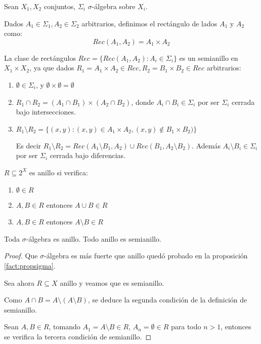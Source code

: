 \begin{example}
 \label{ex:rectangulos}
 \begin{definition*}
  Sean $X_1, X_2$ conjuntos, $\Sigma_i$ $\sigma$-álgebra sobre $X_i$. 
  
  Dados $A_1 \in \Sigma_1, A_2 \in \Sigma_2$ arbitrarios, definimos el rectángulo de lados $A_1$ y $A_2$ como:
  \[
    Rec(A_1, A_2) = A_1 \times A_2
  \]
 \end{definition*}
 
 
 La clase de rectángulos $Rec = \{Rec(A_1, A_2): A_i \in \Sigma_i\}$ es un semianillo en $X_1 \times X_2$,
 ya que dados $R_1 = A_1 \times A_2 \in Rec, R_2 = B_1 \times B_2 \in Rec$ arbitrarios:
 
 \begin{enumerate}
  \item $\emptyset \in \Sigma_i$, y $\emptyset \times \emptyset = \emptyset$
  \item $R_1 \cap R_2 = (A_1 \cap B_1) \times (A_2 \cap B_2)$, donde $A_i \cap B_i \in \Sigma_i$ por ser 
  $\Sigma_i$ cerrada bajo intersecciones.
  \item $R_1 \setminus R_2 = \{(x,y): (x,y) \in A_1 \times A_2, (x,y) \notin B_1 \times B_2)\}$
  
  Es decir $R_1 \setminus R_2 = Rec(A_1\setminus B_1, A_2) \cup Rec(B_1, A_2\setminus B_2)$. Además
  $A_i \setminus B_i \in \Sigma_i$ por ser $\Sigma_i$ cerrada bajo diferencias.
 \end{enumerate}

\end{example}


\begin{definition}[Anillo en $X$]
 $R\subseteq 2^X$ es anillo si verifica:
 
 \begin{enumerate}[i]
  \item $\emptyset \in R$
  \item $A,B \in R$ entonces $A\cup B \in R$
  \item $A,B \in R$ entonces $A\setminus B \in R$
 \end{enumerate}
\end{definition}


\begin{fact}
 Toda $\sigma$-álgebra es anillo. Todo anillo es semianillo.
\end{fact}

  \begin{proof}
   Que $\sigma$-álgebra es más fuerte que anillo quedó probado en la proposición \ref{fact:propsigma}.
   
   Sea ahora $R \subseteq X$ anillo y veamos que es semianillo.

   Como $A\cap B = A\setminus (A\setminus B)$, se deduce la segunda condición de la definición de semianillo.
   
   Sean $A, B \in R$, tomando $A_1 = A\setminus B \in R$, $A_n = \emptyset \in R$ para todo $n > 1$, entonces se 
   verifica la tercera condición de semianillo.
  \end{proof}

